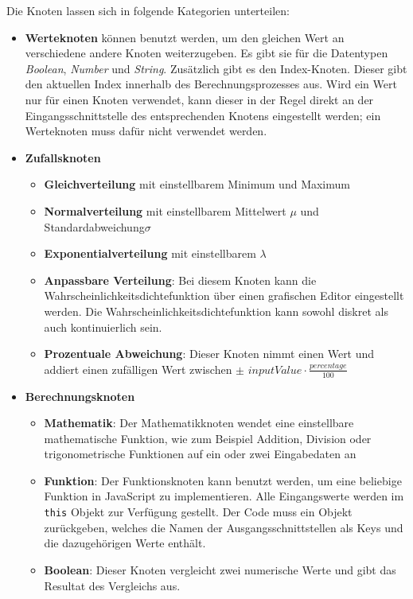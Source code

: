 Die Knoten lassen sich in folgende Kategorien unterteilen:
\begin{itemize}
    \item \textbf{Werteknoten} können benutzt werden, um den gleichen Wert an verschiedene andere Knoten weiterzugeben. Es gibt sie für die Datentypen \textit{Boolean}, \textit{Number} und \textit{String}. Zusätzlich gibt es den Index-Knoten. Dieser gibt den aktuellen Index innerhalb des Berechnungsprozesses aus. Wird ein Wert nur für einen Knoten verwendet, kann dieser in der Regel direkt an der Eingangsschnittstelle des entsprechenden Knotens eingestellt werden; ein Werteknoten muss dafür nicht verwendet werden.
    \item \textbf{Zufallsknoten}
    \begin{itemize}
        \item \textbf{Gleichverteilung} mit einstellbarem Minimum und Maximum
        \item \textbf{Normalverteilung} mit einstellbarem Mittelwert $\mu$ und Standardabweichung\nobreakspace $\sigma$
        \item \textbf{Exponentialverteilung} mit einstellbarem $\lambda$
        \item \textbf{Anpassbare Verteilung}: Bei diesem Knoten kann die Wahrscheinlichkeitsdichtefunktion über einen grafischen Editor eingestellt werden. Die Wahrscheinlichkeitsdichtefunktion kann sowohl diskret als auch kontinuierlich sein.
        \item \textbf{Prozentuale Abweichung}: Dieser Knoten nimmt einen Wert und addiert einen zufälligen Wert zwischen $\pm \, \, inputValue \cdot \frac{percentage}{100}$
    \end{itemize}
    \item \textbf{Berechnungsknoten}
    \begin{itemize}
        \item \textbf{Mathematik}: Der Mathematikknoten wendet eine einstellbare mathematische Funktion, wie zum Beispiel Addition, Division oder trigonometrische Funktionen auf ein oder zwei Eingabedaten an
        \item \textbf{Funktion}: Der Funktionsknoten kann benutzt werden, um eine beliebige Funktion in JavaScript zu implementieren. Alle Eingangswerte werden im \texttt{this} Objekt zur Verfügung gestellt. Der Code muss ein Objekt zurückgeben, welches die Namen der Ausgangsschnittstellen als Keys und die dazugehörigen Werte enthält.
        \item \textbf{Boolean}: Dieser Knoten vergleicht zwei numerische Werte und gibt das Resultat des Vergleichs aus.

\end{itemize}
\end{itemize}
